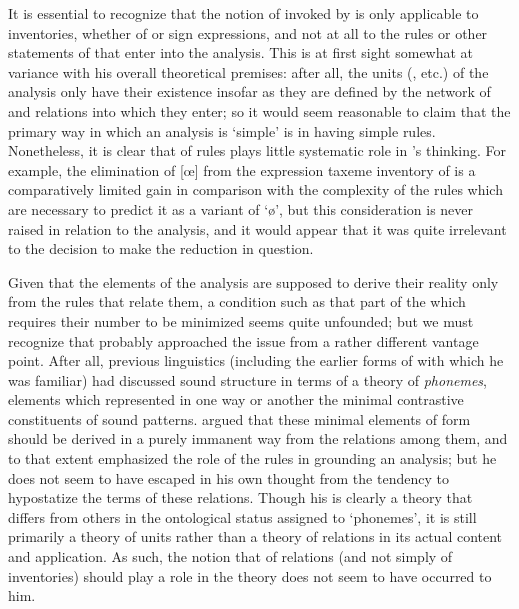 It is essential to recognize that the notion of  invoked by
{\Hjelmslev} is only applicable to inventories, whether of  or
sign expressions, and not at all to the {rules} or other statements of
 that enter into the analysis. This is at first
sight somewhat at variance with his overall theoretical premises:
after all, the units (, etc.) of the analysis only have their
existence insofar as they are defined by the network of  and
relations into which they enter; so it would seem reasonable to claim
that the primary way in which an analysis is `simple' is in having
simple {rules}. Nonetheless, it is clear that  of {rules} plays
little systematic role in {\Hjelmslev}'s thinking. For example, the
elimination of {[œ]} from the expression taxeme inventory of  is
a comparatively limited gain in comparison with the complexity of the
{rules} which are necessary to predict it as a variant of `ø', but this
consideration is never raised in relation to the analysis, and it
would appear that it was quite irrelevant to the decision to make the
reduction in question.

Given that the elements of the analysis are supposed to derive their
reality only from the {rules} that relate them, a condition such as that
part of the  which requires their number to be
minimized seems quite unfounded; but we must recognize that {\Hjelmslev}
probably approached the issue from a rather different vantage
point. After all, previous linguistics (including the earlier forms of
 with which he was familiar) had discussed sound
structure in terms of a theory of \emph{phonemes}, elements which
represented in one way or another the minimal contrastive constituents
of sound patterns. {\Hjelmslev} argued that these minimal elements of
form should be derived in a purely immanent way from the relations
among them, and to that extent emphasized the role of the {rules} in
grounding an analysis; but he does not seem to have escaped in his own
thought from the tendency to hypostatize the terms of these
relations. Though his is clearly a theory that differs from others in
the ontological status assigned to `phonemes', it is still primarily a
theory of units rather than a theory of relations in its actual
content and application. As such, the notion that  of
relations (and not simply of inventories) should play a role in the
theory does not seem to have occurred to him.


